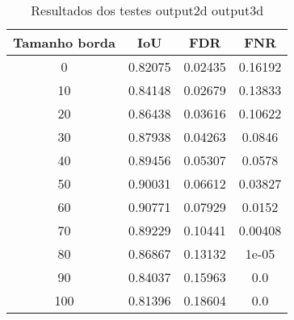 \begin{table}[h]
    \centering
    \caption{Resultados dos testes output2d output3d}
    \label{tab:border_2d_solution_output_2d_output_3d}
    \begin{tabular}{|c|c|c|c|}
        \hline
        Tamanho borda & IoU & FDR & FNR \\
        \hline
        0 & 0.82075 & 0.02435 & 0.16192\\
        10 & 0.84148 & 0.02679 & 0.13833\\
        20 & 0.86438 & 0.03616 & 0.10622\\
        30 & 0.87938 & 0.04263 & 0.0846\\
        40 & 0.89456 & 0.05307 & 0.0578\\
        50 & 0.90031 & 0.06612 & 0.03827\\
        60 & 0.90771 & 0.07929 & 0.0152\\
        70 & 0.89229 & 0.10441 & 0.00408\\
        80 & 0.86867 & 0.13132 & 1e-05\\
        90 & 0.84037 & 0.15963 & 0.0\\
        100 & 0.81396 & 0.18604 & 0.0\\
        \hline
    \end{tabular}
\end{table}


